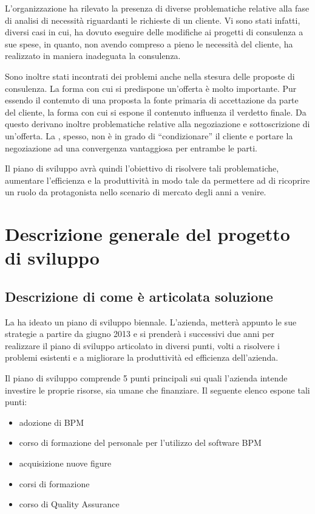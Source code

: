 L'organizzazione ha rilevato la presenza di diverse problematiche relative alla fase di analisi di necessità riguardanti le richieste di un cliente. Vi sono stati infatti, diversi casi in cui, \customer  ha dovuto eseguire delle modifiche ai progetti di consulenza a sue spese, in quanto, non avendo compreso a pieno le necessità del cliente, ha  realizzato in maniera inadeguata la consulenza. 

Sono inoltre stati incontrati dei problemi anche nella stesura delle proposte di consulenza. La forma con cui si predispone un'offerta è molto importante. Pur essendo il contenuto di una proposta la fonte primaria di accettazione da parte del cliente, la forma con cui si espone il contenuto influenza il verdetto finale.
Da questo derivano inoltre problematiche relative alla negoziazione e sottoscrizione di un'offerta. La \customer , spesso, non è in grado di ``condizionare'' il cliente e portare la negoziazione ad una convergenza vantaggiosa per entrambe le parti.

Il piano di sviluppo avrà quindi l'obiettivo di risolvere tali problematiche, aumentare l'efficienza e la produttività in modo tale da permettere ad \customer di ricoprire un ruolo da protagonista nello scenario di mercato degli anni a venire.


\chapter{Descrizione generale del progetto di sviluppo}

\section{Descrizione di come è articolata soluzione}
La \customer ha ideato un piano di sviluppo biennale. L'azienda, metterà appunto le sue strategie a partire da giugno 2013 e si prenderà i successivi due anni per realizzare il piano di sviluppo articolato in diversi punti, volti a risolvere i problemi esistenti e a migliorare la produttività ed efficienza dell'azienda.
		
Il piano di sviluppo comprende 5 punti principali sui quali l'azienda intende investire le proprie risorse, sia umane che finanziare. Il seguente elenco espone tali punti:
	\begin{itemize}
  		\item adozione di  BPM
       \item corso di formazione del personale per l'utilizzo del software BPM
       \item acquisizione nuove figure
       \item corsi di formazione 
        \item corso di Quality Assurance  
     \end{itemize}
	
